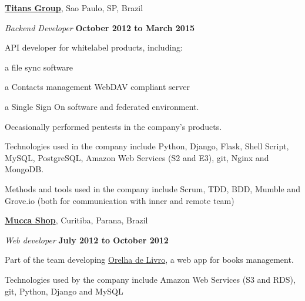 \documentclass[10pt]{article}
\newenvironment{outerlist}[1][\enskip\textbullet]%
        {\begin{itemize}[#1]}{\end{itemize}%
         \vspace{-.6\baselineskip}}
\newenvironment{innerlist}[1][\enskip\textbullet]%
        {\begin{compactitem}[#1]}{\end{compactitem}}
\newcommand{\blankline}{\quad\pagebreak[2]}
\begin{document}
\blankline

\href{http://titansgroup.com.br/}{\textbf{Titans Group}},
Sao Paulo, SP, Brazil
\begin{outerlist}

\item[] \textit{Backend Developer}%
        \hfill \textbf{October 2012 to March 2015}
\begin{innerlist}
    \item API developer for whitelabel products, including:
        \begin{innerlist}
            \item a file sync software
            \item a Contacts management WebDAV compliant server
            \item a Single Sign On software and federated environment.
        \end{innerlist}
    \item Occasionally performed pentests in the company's products.

    \item Technologies used in the company include Python, Django, Flask, Shell Script, MySQL, PostgreSQL, Amazon Web Services
    (S2 and E3), git, Nginx and MongoDB.
    \item Methods and tools used in the company include Scrum, TDD, BDD, Mumble and Grove.io (both for communication
    with inner and remote team)
\end{innerlist}

\end{outerlist}

\blankline

\href{http://www.muccashop.com.br/}{\textbf{Mucca Shop}},
Curitiba, Parana, Brazil
\begin{outerlist}

\item[] \textit{Web developer}%
        \hfill \textbf{July 2012 to October 2012}
\begin{innerlist}
    \item Part of the team developing \href{http://www.orelhadelivro.com.br/}{Orelha de Livro}, a web
    app for books management.
    \item Technologies used by the company include Amazon Web Services (S3 and RDS), git, Python, Django and MySQL
\end{innerlist}

\end{outerlist}
\end{document}
